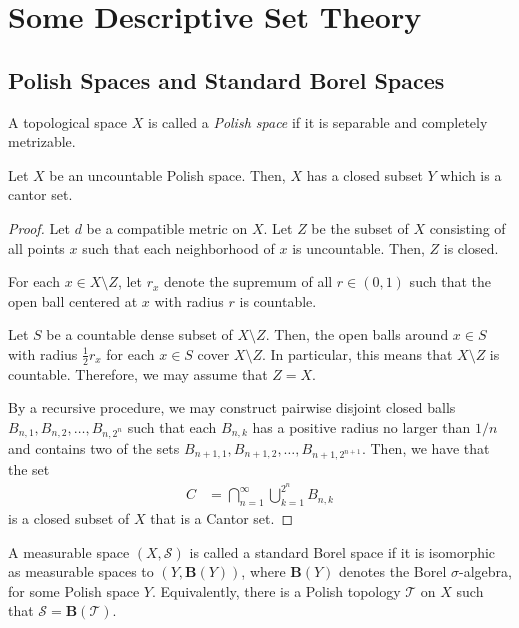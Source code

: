 \documentclass[10pt]{mypackage}
\begin{document}
\RaggedRight
\section{Some Descriptive Set Theory}%
\subsection{Polish Spaces and Standard Borel Spaces}%
\begin{definition}
  A topological space $X$ is called a \textit{Polish space} if it is separable and completely metrizable.
\end{definition}
\begin{theorem}
  Let $X$ be an uncountable Polish space. Then, $X$ has a closed subset $Y$ which is a cantor set.
\end{theorem}
\begin{proof}
  Let $d$ be a compatible metric on $X$. Let $Z$ be the subset of $X$ consisting of all points $x$ such that each neighborhood of $x$ is uncountable. Then, $Z$ is closed.

  For each $x\in X\setminus Z$, let $r_x$ denote the supremum of all $r\in \left( 0,1 \right)$ such that the open ball centered at $x$ with radius $r$ is countable.

  Let $S$ be a countable dense subset of $X\setminus Z$. Then, the open balls around $x\in S$ with radius $\frac{1}{2}r_x$ for each $x\in S$ cover $X\setminus Z$. In particular, this means that $X\setminus Z$ is countable. Therefore, we may assume that $Z = X$.

  By a recursive procedure, we may construct pairwise disjoint closed balls $B_{n,1},B_{n,2},\dots,B_{n,2^{n}}$ such that each $B_{n,k}$ has a positive radius no larger than $1/n$ and contains two of the sets $B_{n+1,1},B_{n+1,2},\dots,B_{n+1,2^{n+1}}$. Then, we have that the set
  \begin{align*}
    C &= \bigcap_{n=1}^{\infty}\bigcup_{k=1}^{2^{n}}B_{n,k}
  \end{align*}
  is a closed subset of $X$ that is a Cantor set.
\end{proof}
\begin{definition}
  A measurable space $\left( X,\mathcal{S} \right)$ is called a standard Borel space if it is isomorphic as measurable spaces to $\left( Y, \mathbf{B}(Y) \right)$, where $ \mathbf{B}(Y) $ denotes the Borel $\sigma$-algebra, for some Polish space $Y$. Equivalently, there is a Polish topology $ \mathcal{T} $ on $X$ such that $ \mathcal{S} = \mathbf{B}\left( \mathcal{T} \right) $.
\end{definition}
\end{document}
